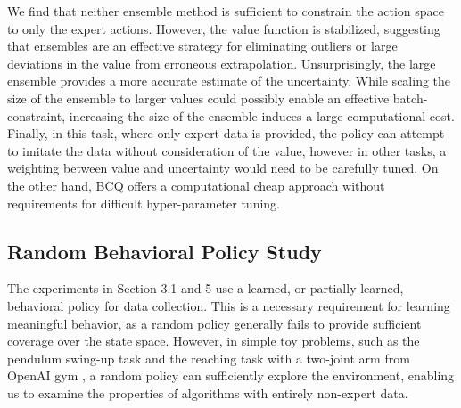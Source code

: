 \documentclass{article}
\begin{document}
We find that neither ensemble method is sufficient to constrain the action space to only the expert actions. However, the value function is stabilized, suggesting that ensembles are an effective strategy for eliminating outliers or large deviations in the value from erroneous extrapolation. Unsurprisingly, the large ensemble provides a more accurate estimate of the uncertainty. While scaling the size of the ensemble to larger values could possibly enable an effective batch-constraint, increasing the size of the ensemble induces a large computational cost. Finally, in this task, where only expert data is provided, the policy can attempt to imitate the data without consideration of the value, however in other tasks, a weighting between value and uncertainty would need to be carefully tuned. On the other hand, BCQ offers a computational cheap approach without requirements for difficult hyper-parameter tuning. 

\clearpage

\subsection{Random Behavioral Policy Study} \label{appendix:random}

The experiments in Section 3.1 and 5 use a learned, or partially learned, behavioral policy for data collection. This is a necessary requirement for learning meaningful behavior, as a random policy generally fails to provide sufficient coverage over the state space. However, in simple toy problems, such as the pendulum swing-up task and the reaching task with a two-joint arm from OpenAI gym \citep{OpenAIGym}, a random policy can sufficiently explore the environment, enabling us to examine the properties of algorithms with entirely non-expert data.
\end{document}
